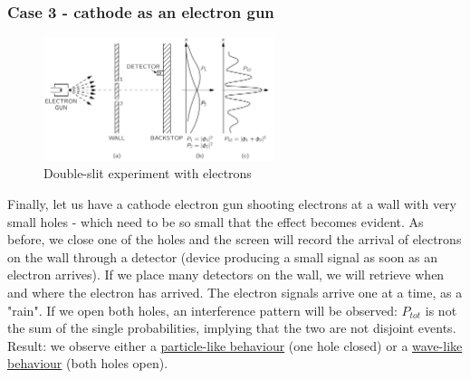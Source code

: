     \subsubsection{Case 3 - cathode as an electron gun}
     \begin{figure}[h!]
    \centering
    \includegraphics[clip, width=0.6\textwidth]{electron_ds.png}
    \caption{\label{fig:electron_ds} Double-slit experiment with electrons}
\end{figure}
\noindent
    Finally, let us have a cathode electron gun shooting electrons at a wall with very small holes - which need to be so small that the effect becomes evident. As before, we close one of the holes and the screen will record the arrival of electrons on the wall through a detector (device producing a small signal as soon as an electron arrives). If we place many detectors on the wall, we will retrieve when and where the electron has arrived. The electron signals arrive one at a time, as a "rain". If we open both holes, an interference pattern will be observed: $P_{tot}$ is not the sum of the single probabilities, implying that the two are not disjoint events. 
Result: we observe either a \underline{particle-like behaviour} (one hole closed) or a \underline{wave-like behaviour} (both holes open).\\
    
